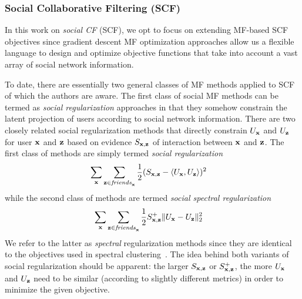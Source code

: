 
\subsubsection{Social Collaborative Filtering (SCF)}
\label{sec:scf_original}

In this work on \emph{social CF} (SCF), we opt to focus on extending
MF-based SCF objectives since gradient descent MF optimization
approaches allow us a flexible language to design and optimize
objective functions that take into account a vast array of social
network information.

To date, there are essentially two general classes of MF methods
applied to SCF of which the authors are aware.  
The first class of social MF methods can be termed as \emph{social
regularization} approaches in that they somehow constrain the latent
projection of users according to social network information.  There
are two closely related social regularization methods that directly
constrain $U_{\mathbf{x}}$ and $U_{\mathbf{z}}$ for user $\mathbf{x}$ and $\mathbf{z}$ based on evidence
$S_{\mathbf{x},\mathbf{z}}$ of interaction between $\mathbf{x}$ and $\mathbf{z}$.  The first class of
methods are simply termed \emph{social
regularization}~\cite{lla,socinf}
\begin{align}
\sum_{\mathbf{x}} & \sum_{\mathbf{z} \in \mathit{friends}_{\mathbf{x}}} \frac{1}{2} (S_{\mathbf{x},\mathbf{z}} - \langle U_{\mathbf{x}}, U_{\mathbf{z}} \rangle)^2 \label{eq:simple_sr}
\end{align}
while the second class of methods are termed 
\emph{social spectral regularization}~\cite{sr,rrmf}
\begin{align}
\sum_{\mathbf{x}} & \sum_{\mathbf{z} \in \mathit{friends}_{\mathbf{x}}} \frac{1}{2} S^+_{\mathbf{x},\mathbf{z}} \| U_{\mathbf{x}} - U_{\mathbf{z}} \|_2^2 \label{eq:simple_spectral_sr}
\end{align}
We refer to the latter as \emph{spectral} regularization methods since they are
identical to the objectives used in spectral clustering~\cite{spectral}.
The idea behind both variants of social regularization should be apparent:
the larger $S_{\mathbf{x},\mathbf{z}}$ or $S^+_{\mathbf{x},\mathbf{z}}$, the more $U_{\mathbf{x}}$ and $U_{\mathbf{z}}$ need to
be similar (according to slightly different metrics) 
in order to minimize the given objective.

